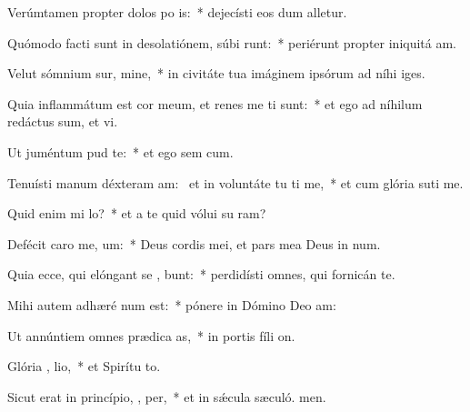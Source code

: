 \item Verúmtamen propter dolos po is:~* dejecísti eos dum alletur.
\item Quómodo facti sunt in desolatiónem, súbi runt:~* periérunt propter iniquitá am.
\item Velut sómnium sur, mine,~* in civitáte tua imáginem ipsórum ad níhi iges.
\item Quia inflammátum est cor meum, et renes me ti sunt:~* et ego ad níhilum redáctus sum, et vi.
\item Ut juméntum   pud te:~* et ego sem cum.
\item Tenuísti manum déxteram am:~\pscross{} et in voluntáte tu ti me,~* et cum glória suti me.
\item Quid enim mi   lo?~* et a te quid vólui su ram?
\item Defécit caro me,   um:~* Deus cordis mei, et pars mea Deus in num.
\item Quia ecce, qui elóngant se  , bunt:~* perdidísti omnes, qui fornicán  te.
\item Mihi autem adhæré  num est:~* pónere in Dómino Deo  am:
\item Ut annúntiem omnes prædica as,~* in portis fíli on.
\item Glória ,  lio,~* et Spirítu to.
\item Sicut erat in princípio,  ,  per,~* et in sǽcula sæculó. men.
